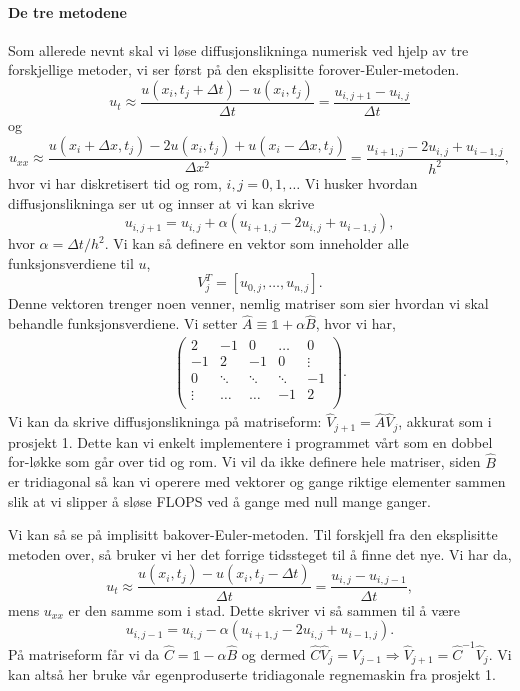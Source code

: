 \documentclass[norsk, 10pt]{article}
\def\para#1{\left( #1 \right)}
\begin{document}
\paragraph{De tre metodene}
Som allerede nevnt skal vi løse diffusjonslikninga numerisk ved hjelp av tre forskjellige metoder, vi ser først på den eksplisitte forover-Euler-metoden. 
 \[
u_t\approx \frac{u(x_i,t_j+\Delta t)-u(x_i,t_j)}{\Delta t} = \frac{u_{i,j+1}-u_{i,j}}{\Delta t}
\]
og
\[
u_{xx}\approx \frac{u(x_i+\Delta x,t_j)-2u(x_i,t_j)+u(x_i-\Delta x,t_j)}{\Delta x^2} = \frac{u_{i+1,j}-2u_{i,j}+u_{i-1,j}}{h^2},
\]
hvor vi har diskretisert tid og rom, $i,j = 0,1,\ldots$ Vi husker hvordan diffusjonslikninga ser ut og innser at vi kan skrive
\begin{equation} u_{i,j+1} = u_{i,j} + \alpha\para{u_{i+1,j}-2u_{i,j}+u_{i-1,j}},\label{eq:eksplisitt} \end{equation}
hvor $\alpha = \Delta t /h^2$. Vi kan så definere en vektor som inneholder alle funksjonsverdiene til $u$,
$$ V_j^T = [u_{0,j},\ldots,u_{n,j}]. $$
Denne vektoren trenger noen venner, nemlig matriser som sier hvordan vi skal behandle funksjonsverdiene. Vi setter $\hat A \equiv \mathbb 1 + \alpha \hat B$, hvor vi har,
\begin{align}\para{\begin{matrix}
2 & -1 & 0 & \ldots & 0 \\
-1 & 2 & -1 & 0& \vdots \\
0 & \ddots & \ddots & \ddots & -1 \\
\vdots & \ldots & \ldots & -1 & 2 \\
\end{matrix}}.
\end{align}
Vi kan da skrive diffusjonslikninga på matriseform: $\hat V_{j+1} = \hat A \hat V_j$, akkurat som i prosjekt 1. Dette kan vi enkelt implementere i programmet vårt som en dobbel for-løkke som går over tid og rom. Vi vil da ikke definere hele matriser, siden $\hat B$ er tridiagonal så kan vi operere med vektorer og gange riktige elementer sammen slik at vi slipper å sløse FLOPS ved å gange med null mange ganger.

Vi kan så se på implisitt bakover-Euler-metoden. Til forskjell fra den eksplisitte metoden over, så bruker vi her det forrige tidssteget til å finne det nye. Vi har da,
 \[
u_t\approx \frac{u(x_i,t_j)-u(x_i,t_j-\Delta t)}{\Delta t} = \frac{u_{i,j}-u_{i,j-1}}{\Delta t},
\]
mens $u_{xx}$ er den samme som i stad. Dette skriver vi så sammen til å være
\begin{equation}
u_{i,j-1} = u_{i,j} - \alpha\para{u_{i+1,j}-2u_{i,j}+u_{i-1,j}}. \label{eq:implisitt}
\end{equation}
På matriseform får vi da $\hat C = \mathbb 1 - \alpha \hat B$ og dermed $\hat C \hat V_j = V_{j-1} \Rightarrow \hat V_{j+1} = \hat C^{-1}\hat V_{j}$. Vi kan altså her bruke vår egenproduserte tridiagonale regnemaskin fra prosjekt 1.
\end{document}
